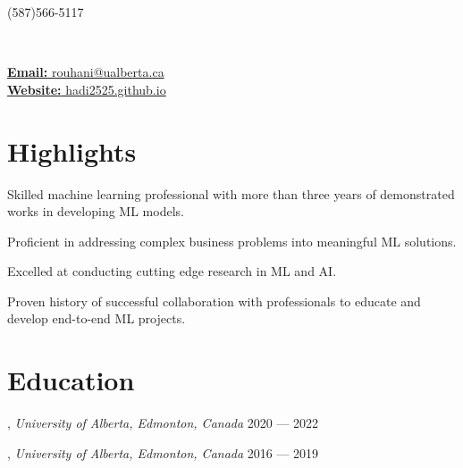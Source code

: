 \documentclass[letter,11pt]{article}
\author{Mohammad Hadi Rouhani} %
\makeatletter
\def\phone{(587)566-5117}
\def\city{}
\def\email{rouhani@ualberta.ca}
\def\Web{hadi2525.github.io}
\def\role{} %
\makeatother
\begin{document}
\begin{center}
	\begin{minipage}[b]{.3\textwidth}
		\raggedright
		{\large \phone} \\ %
		{\city} %
		
	\end{minipage}%
	\begin{minipage}[b]{.4\textwidth}
		\makeatletter
		\centering {\HUGE \@author} \\
		\makeatother
		\vspace{.5em}
		{\color{highlight} \Large{\role}}
	\end{minipage}%
	\begin{minipage}[b]{.3\textwidth}
		\raggedleft 
		\href{mailto:\email}{\textbf{Email:} \email}\\ 
		\href{https://hadi2525.github.io/\Web}{\textbf{Website:} \Web}
	\end{minipage}

\end{center}
\vspace{-1em}	
\section{Highlights}
\begin{zitemize}
	\item Skilled machine learning professional with more than three years of demonstrated works in developing ML models.
	\item Proficient in addressing complex business problems into meaningful ML solutions.
	\item Excelled at conducting cutting edge research in ML and AI.
	\item Proven history of successful collaboration with professionals to educate and develop end-to-end ML projects.
\end{zitemize}
\section{Education}
, \textit{University of Alberta, Edmonton, Canada}	\hfill  2020 --- 2022

,  \textit{University of Alberta, Edmonton, Canada}	\hfill  2016 --- 2019
\end{document}
